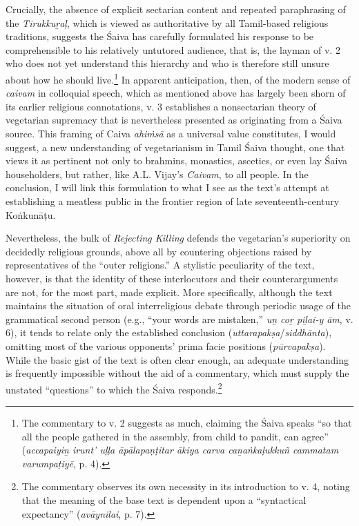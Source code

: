 Crucially, the absence of explicit sectarian content and repeated paraphrasing of the \emph{{Tirukkuṟaḷ}}, which is viewed as authoritative by all Tamil-based religious traditions, suggests the Śaiva has carefully formulated his response to be comprehensible to his relatively untutored audience, that is, the layman of v. 2 who does not yet understand this hierarchy and who is therefore still unsure about how he should live.\footnote{%
The commentary to v. 2 suggests as much, claiming the Śaiva speaks “so that all the people gathered in the assembly, from child to pandit, can agree” (\emph{accapaiyiṉ irunt’ uḷḷa āpālapaṇṭitar ākiya carva caṉaṅkaḷukkuñ cammatam varumpaṭiyē}, p. 4). 
}
 In apparent anticipation, then, of the modern sense of \emph{caivam} in colloquial speech, which as mentioned above has largely been shorn of its earlier religious connotations, v. 3 establishes a nonsectarian theory of vegetarian supremacy that is nevertheless presented as originating from a Śaiva source. This framing of Caiva \emph{ahiṁsā} as a universal value constitutes, I would suggest, a new understanding of vegetarianism in Tamil Śaiva thought, one that views it as pertinent not only to brahmins, monastics, ascetics, or even lay Śaiva householders, but rather, like A.\thinskip{}L. Vijay’s \emph{{Caivam}}, to all people. In the conclusion, I will link this formulation to what I see as the text’s attempt at establishing a meatless public in the frontier region of late seventeenth-century Koṅkunāṭu.


Nevertheless, the bulk of \emph{Rejecting Killing} defends the vegetarian’s superiority on decidedly religious grounds, above all by countering objections raised by representatives of the “outer religions.” A stylistic peculiarity of the text, however, is that the identity of these interlocutors and their counterarguments are not, for the most part, made explicit. More specifically, although the text maintains the situation of oral interreligious debate through periodic usage of the grammatical second person (e.g., “your words are mistaken,” \emph{uṉ coṟ piḻai-y ām}, v. 6), it tends to relate only the established conclusion (\emph{uttarapakṣa}/\emph{siddhānta}), omitting most of the various opponents’ prima facie positions (\emph{pūrvapakṣa}). While the basic gist of the text is often clear enough, an adequate understanding is frequently impossible without the aid of a commentary, which must supply the unstated “questions” to which the Śaiva responds.\footnote{%
The commentary observes its own necessity in its introduction to v. 4, noting that the meaning of the base text is dependent upon a “syntactical expectancy” (\emph{avāynilai}, p. 7).
}



